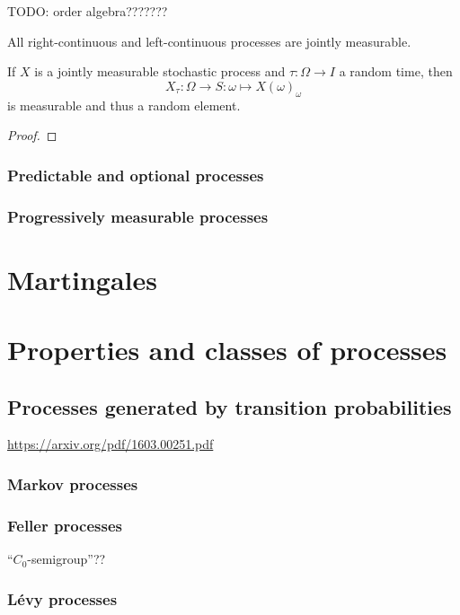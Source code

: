TODO: order algebra???????

\begin{lemma}
All right-continuous and left-continuous processes are jointly measurable. 
\end{lemma}

\begin{proposition}
If $X$ is a jointly measurable stochastic process and $\tau: \Omega\to I$ a random time, then
\[ X_\tau: \Omega\to S: \omega\mapsto X(\omega)_{\omega} \]
is measurable and thus a random element.
\end{proposition}
\begin{proof}

\end{proof}

\subsubsection{Predictable and optional processes}

\subsubsection{Progressively measurable processes}

\section{Martingales}

\section{Properties and classes of processes}
\subsection{Processes generated by transition probabilities}
\url{https://arxiv.org/pdf/1603.00251.pdf}
\subsubsection{Markov processes}
\subsubsection{Feller processes}
``$C_0$-semigroup''??
\subsubsection{Lévy processes}

